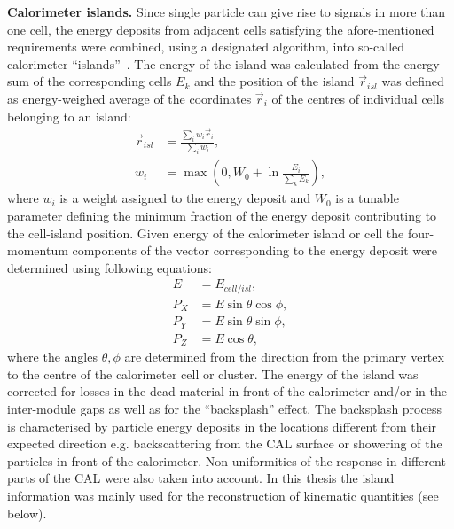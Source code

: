\textbf{Calorimeter islands.}
Since single particle can give rise to signals in more than one cell, the energy deposits from adjacent cells satisfying the afore-mentioned requirements were combined, using a designated algorithm, into so-called calorimeter ``islands''~\cite{upub:grosse-knetter:zn9739}. The energy of the island was calculated from the energy sum of the corresponding cells $E_k$ and the position of the island $\vec{r}_{isl}$ was defined as energy-weighed average of the coordinates $\vec{r}_i$ of the centres of individual cells belonging to an island:
\begin{align}
\vec{r}_{isl} &= \frac{\sum_i{w_i \vec{r}_i}}{\sum_i{w_i}}, \\
w_i &= \max\left(0,W_0+\ln{\frac{E_i}{\sum_k{E_k}}}\right),
\end{align}
where $w_i$ is a weight assigned to the energy deposit and $W_0$ is a tunable parameter defining the minimum fraction of the energy deposit contributing to the cell-island position. Given energy of the calorimeter island or cell the four-momentum components of the vector corresponding to the energy deposit were determined using following equations:
\begin{align}
	E    &= E_{cell/isl}, \\
	P_X &= E \sin{\theta}\cos{\phi}, \\
	P_Y &= E \sin{\theta}\sin{\phi}, \\
	P_Z &= E \cos{\theta},
\end{align}
where the angles $\theta, \phi$ are determined from the direction from the primary vertex to the centre of the calorimeter cell or cluster. The energy of the island was corrected for losses in the dead material in front of the calorimeter and/or in the inter-module gaps as well as for the ``backsplash'' effect. The backsplash process is characterised by particle energy deposits in the locations different from their expected direction e.g. backscattering from the CAL surface or showering of the particles in front of the calorimeter. Non-uniformities of the response in different parts of the CAL were also taken into account. In this thesis the island information was mainly used for the reconstruction of kinematic quantities (see below).